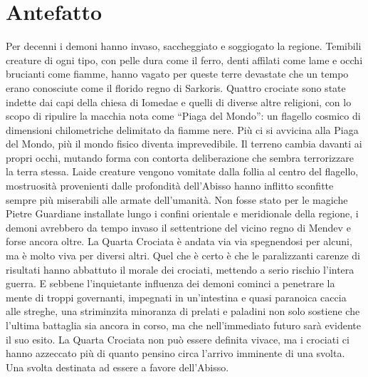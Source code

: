 \chapter*{Antefatto}

Per decenni i demoni hanno invaso, saccheggiato e soggiogato la regione. Temibili creature di ogni tipo, con pelle dura come il ferro, denti affilati come lame e occhi brucianti come fiamme, hanno vagato per queste terre devastate che un tempo erano conosciute come il florido regno di Sarkoris. Quattro crociate sono state indette dai capi della chiesa di Iomedae e quelli di diverse altre religioni, con lo scopo di ripulire la macchia nota come ``Piaga del Mondo'': un flagello cosmico di dimensioni chilometriche delimitato da fiamme nere. Pi\`u ci si avvicina alla Piaga del Mondo, pi\`u il mondo fisico diventa imprevedibile. Il terreno cambia davanti ai propri occhi, mutando forma con contorta deliberazione che sembra terrorizzare la terra stessa. Laide creature vengono vomitate dalla follia al centro del flagello, mostruosit\`a provenienti dalle profondit\`a dell'Abisso hanno inflitto sconfitte sempre pi\`u miserabili alle armate dell'umanit\`a. Non fosse stato per le magiche Pietre Guardiane installate lungo i confini orientale e meridionale della regione, i demoni avrebbero da tempo invaso il settentrione del vicino regno di Mendev e forse ancora oltre. La Quarta Crociata \`e andata via via spegnendosi per alcuni, ma \`e molto viva per diversi altri. Quel che \`e certo \`e che le paralizzanti carenze di risultati hanno abbattuto il morale dei crociati, mettendo a serio rischio l'intera guerra. E sebbene l'inquietante influenza dei demoni cominci a penetrare la mente di troppi governanti, impegnati in un'intestina e quasi paranoica caccia alle streghe, una striminzita minoranza di prelati e paladini non solo sostiene che l'ultima battaglia sia ancora in corso, ma che nell'immediato futuro sar\`a evidente il suo esito. La Quarta Crociata non pu\`o essere definita vivace, ma i crociati ci hanno azzeccato pi\`u di quanto pensino circa l'arrivo imminente di una svolta. Una svolta destinata ad essere a favore dell'Abisso.